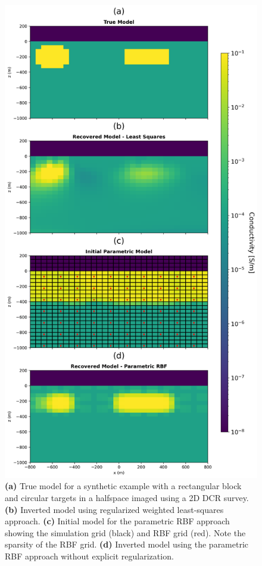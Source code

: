 \documentclass{segabs}
\begin{document}
\begin{figure}[b]
    \centering
    \includegraphics[width=\columnwidth]{figures/block_all_4_title.png}
    \caption{ \textbf{(a)} True model for a synthetic example with a rectangular block and circular targets in a halfspace imaged using a 2D DCR survey. \textbf{(b)} Inverted model using regularized weighted least-squares approach. \textbf{(c)} Initial model for the parametric RBF approach showing the simulation grid (black) and RBF grid (red). Note the sparsity of the RBF grid. \textbf{(d)} Inverted model using the parametric RBF approach without explicit regularization. }
    \label{fig:block_sphere}
\end{figure}
\end{document}
